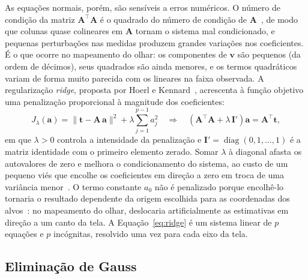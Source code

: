 As equações normais, porém, são sensíveis a erros numéricos. O número de condição da matriz $\mathbf{A}^\top\mathbf{A}$ é o quadrado do número de condição de $\mathbf{A}$~\cite{golub2013matrix}, de modo que colunas quase colineares em $\mathbf{A}$ tornam o sistema mal condicionado, e pequenas perturbações nas medidas produzem grandes variações nos coeficientes. É o que ocorre no mapeamento do olhar: os componentes de $\mathbf{v}$ são pequenos (da ordem de décimos), seus quadrados são ainda menores, e os termos quadráticos variam de forma muito parecida com os lineares na faixa observada. A regularização \textit{ridge}, proposta por Hoerl e Kennard~\cite{hoerl1970ridge}, acrescenta à função objetivo uma penalização proporcional à magnitude dos coeficientes:
\begin{equation}
    J_\lambda(\mathbf{a}) = \lVert \mathbf{t} - \mathbf{A}\,\mathbf{a} \rVert^2 + \lambda \sum_{j=1}^{p-1} a_j^2
    \quad \Longrightarrow \quad
    \left(\mathbf{A}^\top \mathbf{A} + \lambda\,\mathbf{I}'\right)\mathbf{a} = \mathbf{A}^\top \mathbf{t},
    \label{eq:ridge}
\end{equation}
em que $\lambda > 0$ controla a intensidade da penalização e $\mathbf{I}' = \operatorname{diag}(0, 1, \ldots, 1)$ é a matriz identidade com o primeiro elemento zerado. Somar $\lambda$ à diagonal afasta os autovalores de zero e melhora o condicionamento do sistema, ao custo de um pequeno viés que encolhe os coeficientes em direção a zero em troca de uma variância menor~\cite{hoerl1970ridge,hastie2009elements}. O termo constante $a_0$ não é penalizado porque encolhê-lo tornaria o resultado dependente da origem escolhida para as coordenadas dos alvos~\cite{hastie2009elements}: no mapeamento do olhar, deslocaria artificialmente as estimativas em direção a um canto da tela. A Equação~\ref{eq:ridge} é um sistema linear de $p$ equações e $p$ incógnitas, resolvido uma vez para cada eixo da tela.

\subsection{Eliminação de Gauss} \label{sec:gauss}

